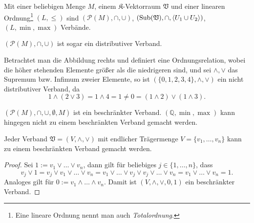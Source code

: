 \begin{example}
    Mit einer beliebigen Menge $M$, einem $\mathfrak{K}$-Vektorraum $\mathfrak{V}$ und einer linearen Ordnung\footnote{Eine lineare Ordnung nennt man auch \emph{Totalordnung}.} $(L, \le)$ sind $(\mathcal{P}(M), \cap, \cup)$, $(\operatorname{Sub}(\mathfrak{V}), \cap, \langle U_1 \cup U_2 \rangle)$, $(L, \min, \max)$ Verbände.

    $(\mathcal{P}(M), \cap, \cup)$ ist sogar ein distributiver Verband.

    \begin{minipage}{0.56\textwidth}
        Betrachtet man die Abbildung rechts und definiert eine Ordnungsrelation, wobei die höher stehenden Elemente größer als die niedrigeren sind, und sei $\wedge, \vee$ das Supremum bzw. Infimum zweier Elemente, so ist $(\{0,1,2,3,4\}, \wedge, \vee)$ ein nicht distributiver Verband, da
        $$ 1 \wedge (2 \vee 3) = 1 \wedge 4 = 1 \neq 0 = (1 \wedge 2) \vee ( 1 \wedge 3). $$
    \end{minipage}
    \hspace{0.02\textwidth}
    \begin{minipage}{0.4\textwidth}
        \centering
    \end{minipage}

    $(\mathcal{P}(M), \cap, \cup, \emptyset, M)$ ist ein beschränkter Verband. $(\mathbb{Q}, \min, \max)$ kann hingegen nicht zu einem beschränkten Verband gemacht werden.
\end{example}

\begin{lemma}
    Jeder Verband $\mathfrak{V} = (V, \wedge, \vee)$ mit endlicher Trägermenge $V = \{v_1, \ldots, v_n\}$ kann zu einem beschränkten Verband gemacht werden.
\end{lemma}
\begin{proof}
    Sei $1 := v_1 \vee \ldots \vee v_n$, dann gilt für beliebiges $j \in \{1, \ldots, n\}$, dass $$v_j \vee 1 = v_j \vee v_1 \vee \ldots \vee v_n =  v_1 \vee \ldots \vee v_j \vee v_j \vee \ldots \vee v_n = v_1 \vee \ldots \vee v_n = 1.$$
    Analoges gilt für $0 := v_1 \wedge \ldots \wedge v_n$. Damit ist $(V, \wedge, \vee, 0, 1)$ ein beschränkter Verband. 
\end{proof}

